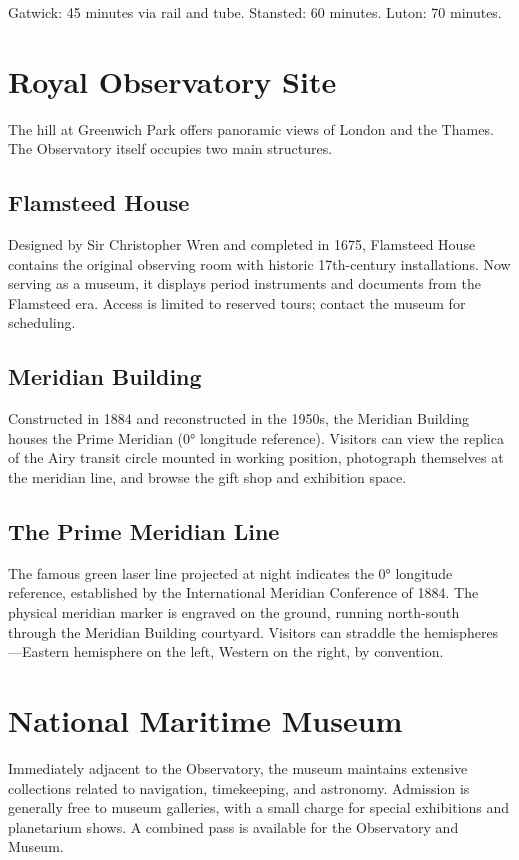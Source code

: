 Gatwick: 45 minutes via rail and tube. Stansted: 60 minutes. Luton: 70 minutes.

\section{Royal Observatory Site}

The hill at Greenwich Park offers panoramic views of London and the Thames. The Observatory itself occupies two main structures.

\subsection*{Flamsteed House}

Designed by Sir Christopher Wren and completed in 1675, Flamsteed House contains the original observing room with historic 17th-century installations. Now serving as a museum, it displays period instruments and documents from the Flamsteed era. Access is limited to reserved tours; contact the museum for scheduling.

\subsection*{Meridian Building}

Constructed in 1884 and reconstructed in the 1950s, the Meridian Building houses the Prime Meridian (0° longitude reference). Visitors can view the replica of the Airy transit circle mounted in working position, photograph themselves at the meridian line, and browse the gift shop and exhibition space.

\subsection*{The Prime Meridian Line}

The famous green laser line projected at night indicates the 0° longitude reference, established by the International Meridian Conference of 1884. The physical meridian marker is engraved on the ground, running north-south through the Meridian Building courtyard. Visitors can straddle the hemispheres—Eastern hemisphere on the left, Western on the right, by convention.

\section{National Maritime Museum}

Immediately adjacent to the Observatory, the museum maintains extensive collections related to navigation, timekeeping, and astronomy. Admission is generally free to museum galleries, with a small charge for special exhibitions and planetarium shows. A combined pass is available for the Observatory and Museum.

